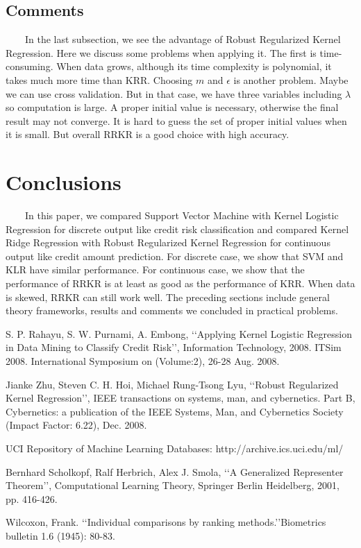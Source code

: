 \documentclass[11pt, oneside]{article}   	%
\begin{document}
\subsection{Comments}
~~~~In the last subsection, we see the advantage of Robust Regularized Kernel Regression.  Here we discuss some problems when applying it.  The first is time-consuming.  When data grows, although its time complexity is polynomial, it takes much more time than KRR.  Choosing $m$ and $\epsilon$ is another problem.  Maybe we can use cross validation.  But in that case, we have three variables including $\lambda$ so computation is large.  A proper initial value is necessary, otherwise the final result may not converge.  It is hard to guess the set of proper initial values when it is small. But overall RRKR is a good choice with high accuracy.

\section{Conclusions}
~~~~In this paper, we compared Support Vector Machine with Kernel Logistic Regression for discrete output like credit risk classification and compared Kernel Ridge Regression with Robust Regularized Kernel Regression for continuous output like credit amount prediction. For discrete case, we show that SVM and KLR have similar performance. For continuous case, we show that the performance of RRKR is at least as good as the performance of KRR.  When data is skewed, RRKR can still work well. The preceding sections include general theory frameworks, results and comments we concluded in practical problems.

\vspace{8pt}
\textbf{\Large{}}

\vspace{8pt}
\noindent[1] S. P. Rahayu, S. W. Purnami, A. Embong, \lq\lq Applying Kernel Logistic Regression in Data Mining to Classify Credit Risk\rq\rq, Information Technology, 2008. ITSim 2008. International Symposium on  (Volume:2), 26-28 Aug. 2008.

\vspace{6pt}
\noindent[2] Jianke Zhu, Steven C. H. Hoi, Michael Rung-Tsong Lyu, \lq\lq Robust Regularized Kernel Regression\rq\rq, IEEE transactions on systems, man, and cybernetics. Part B, Cybernetics: a publication of the IEEE Systems, Man, and Cybernetics Society (Impact Factor: 6.22), Dec. 2008.

\vspace{6pt}
\noindent[3] UCI Repository of Machine Learning Databases: http://archive.ics.uci.edu/ml/

\vspace{6pt}
\noindent[4] Bernhard Scholkopf, Ralf Herbrich, Alex J. Smola, \lq\lq A Generalized Representer Theorem\rq\rq, Computational Learning Theory, Springer Berlin Heidelberg, 2001, pp. 416-426.

\vspace{6pt}
\noindent[5] Wilcoxon, Frank. \lq\lq Individual comparisons by ranking methods.\rq\rq Biometrics bulletin 1.6 (1945): 80-83.
\end{document}
